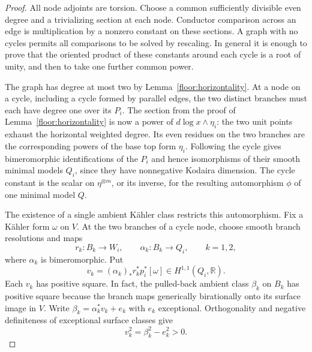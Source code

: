 \documentclass[11pt,letterpaper]{article}
\newcommand{\R}{\mathbb{R}}
\theoremstyle{definition}
\theoremstyle{remark}
\begin{document}
\begin{proof}
All node adjoints are torsion.  Choose a common sufficiently
divisible even degree and a trivializing section at each
node.  Conductor comparison across an edge is multiplication
by a nonzero constant on these sections.  A graph with no
cycles permits all comparisons to be solved by rescaling.
In general it is enough to prove that the oriented product
of these constants around each cycle is a root of unity,
and then to take one further common power.

The graph has degree at most two by
Lemma~\ref{floor:horizontality}.  At a node on a cycle,
including a cycle formed by parallel edges, the two distinct
branches must each have degree one over its $P_i$.  The
section from the proof of Lemma~\ref{floor:horizontality}
is now a power of $d\log x\wedge\eta_i$: the two unit
points exhaust the horizontal weighted degree.  Its even
residues on the two branches are the corresponding powers
of the base top form $\eta_i$.  Following the cycle gives
bimeromorphic identifications of the $P_i$ and hence
isomorphisms of their smooth minimal models $Q_i$, since
they have nonnegative Kodaira dimension.  The cycle
constant is the scalar on $\eta^{\otimes m}$, or its
inverse, for the resulting automorphism $\phi$ of one
minimal model $Q$.

The existence of a single ambient K\"ahler class restricts
this automorphism.  Fix a K\"ahler form $\omega$ on $V$.
At the two branches of a cycle node, choose smooth branch
resolutions and maps
\[
 r_k:B_k\longrightarrow W_i,\qquad
 \alpha_k:B_k\longrightarrow Q_i,\qquad k=1,2,
\]
where $\alpha_k$ is bimeromorphic.  Put
\[
 v_k=(\alpha_k)_*r_k^*p_i^*[\omega]
       \in H^{1,1}(Q_i,\R).
\]
Each $v_k$ has positive square.  In fact, the pulled-back
ambient class $\beta_k$ on $B_k$ has positive square because
the branch maps generically birationally onto its surface
image in $V$.  Write
$\beta_k=\alpha_k^*v_k+e_k$ with $e_k$ exceptional.
Orthogonality and negative definiteness of exceptional
surface classes give
\begin{equation}
 \label{floor:positive-branch-class}
 v_k^2=\beta_k^2-e_k^2>0.
\end{equation}


\end{proof}
\end{document}
